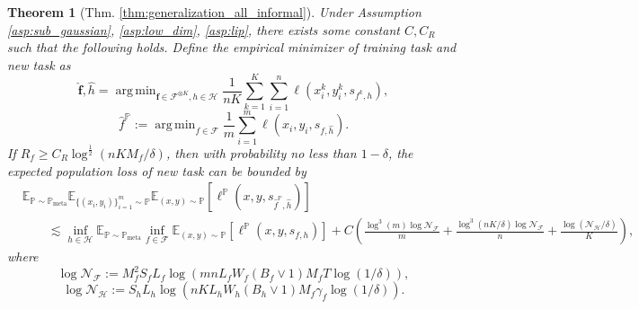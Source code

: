 \documentclass{article}
\numberwithin{equation}{section}
\def\vf{{\bm{f}}}
\newcommand{\E}{\mathbb{E}}
\DeclareMathOperator*{\argmin}{arg\,min}
\newtheorem{thm}{Theorem}[section]
\theoremstyle{definition}
\newcommand{\Pmeta}{\mathbb{P}_{\text{meta}}}
\renewcommand{\P}{\mathbb{P}}
\begin{document}
\begin{thm}[Thm. \ref{thm:generalization_all_informal}]
\label{thm:generalization_all}
    Under Assumption \ref{asp:sub_gaussian}, \ref{asp:low_dim}, \ref{asp:lip},
    there exists some constant $C,C_R$ such that the following holds.
    Define the empirical minimizer of training task and new task as
    \begin{equation}
        \widehat{\vf},\widehat{h}=\argmin_{\vf\in\mathcal{F}^{\otimes K},h\in\mathcal{H}} \frac{1}{nK}\sum_{k=1}^K\sum_{i=1}^n\ell(x_i^k,y_i^k,s_{f^k,h}),
    \end{equation}
    \begin{equation}
        \widehat{f}^\P:= \argmin_{f\in\mathcal{F}} \frac{1}{m}\sum_{i=1}^m \ell(x_i,y_i,s_{f,\widehat{h}}).
    \end{equation}
    If $R_f\geq C_R\log^{\frac{1}{2}}(nKM_f/\delta)$,
    then with probability no less than $1-\delta$, the expected population loss of new task can be bounded by
    \begin{equation}
        \begin{aligned}
            &\E_{\P\sim\Pmeta}\E_{\{(x_i,y_i)\}_{i=1}^m\sim \P} \E_{(x,y)\sim\P} [\ell^\P(x,y,s_{\widehat{f}^\P,\widehat{h}})] \\
            &\qquad \lesssim \inf_{h\in\mathcal{H}} \E_{\P\sim\Pmeta} \inf_{f\in\mathcal{F}}\E_{(x,y)\sim\P} [\ell^\P (x,y,s_{f,h})] + C \left(\frac{\log^3(m)\log\mathcal{N}_\mathcal{F}}{m} + \frac{\log^3(nK/\delta)\log\mathcal{N}_\mathcal{F}}{n}+\frac{\log(\mathcal{N}_\mathcal{H}/\delta)}{K}\right),
        \end{aligned}
    \end{equation}
    where
    \begin{equation}
        \log\mathcal{N}_\mathcal{F}:=M_f^2S_fL_f\log\left(mnL_fW_f(B_f\vee 1)M_fT\log(1/\delta)\right),
    \end{equation}
    \begin{equation}
        \log\mathcal{N}_\mathcal{H}:=S_hL_h\log\left(nKL_hW_h(B_h\vee 1)M_f\gamma_f\log(1/\delta)\right).
    \end{equation}
\end{thm}
\end{document}
